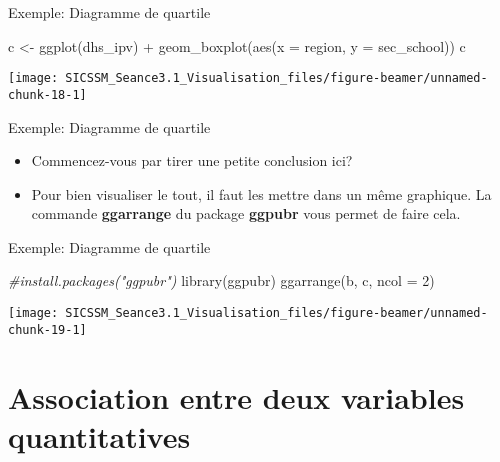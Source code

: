 \documentclass[
  ignorenonframetext,
]{beamer}
\newenvironment{Shaded}{\begin{snugshade}}{\end{snugshade}}
\newcommand{\AttributeTok}[1]{\textcolor[rgb]{0.77,0.63,0.00}{#1}}
\newcommand{\CommentTok}[1]{\textcolor[rgb]{0.56,0.35,0.01}{\textit{#1}}}
\newcommand{\DecValTok}[1]{\textcolor[rgb]{0.00,0.00,0.81}{#1}}
\newcommand{\FunctionTok}[1]{\textcolor[rgb]{0.00,0.00,0.00}{#1}}
\newcommand{\NormalTok}[1]{#1}
\newcommand{\OtherTok}[1]{\textcolor[rgb]{0.56,0.35,0.01}{#1}}
\newcommand{\SpecialCharTok}[1]{\textcolor[rgb]{0.00,0.00,0.00}{#1}}
\providecommand{\tightlist}{%
  \setlength{\itemsep}{0pt}\setlength{\parskip}{0pt}}
\begin{document}
\begin{frame}[fragile]{Exemple: Diagramme de quartile}
\protect\hypertarget{exemple-diagramme-de-quartile-2}{}
\begin{Shaded}
\begin{Highlighting}[]
\NormalTok{c }\OtherTok{\textless{}{-}} \FunctionTok{ggplot}\NormalTok{(dhs\_ipv) }\SpecialCharTok{+} 
  \FunctionTok{geom\_boxplot}\NormalTok{(}\FunctionTok{aes}\NormalTok{(}\AttributeTok{x =}\NormalTok{ region, }\AttributeTok{y =}\NormalTok{ sec\_school))}
\NormalTok{c}
\end{Highlighting}
\end{Shaded}

\begin{center}\texttt{[image: SICSSM\_Seance3.1\_Visualisation\_files/figure-beamer/unnamed-chunk-18-1]} \end{center}
\end{frame}

\begin{frame}{Exemple: Diagramme de quartile}
\protect\hypertarget{exemple-diagramme-de-quartile-3}{}
\begin{itemize}
\tightlist
\item
  Commencez-vous par tirer une petite conclusion ici?
\item
  Pour bien visualiser le tout, il faut les mettre dans un même
  graphique. La commande \textbf{ggarrange} du package \textbf{ggpubr}
  vous permet de faire cela.
\end{itemize}
\end{frame}

\begin{frame}[fragile]{Exemple: Diagramme de quartile}
\protect\hypertarget{exemple-diagramme-de-quartile-4}{}
\begin{Shaded}
\begin{Highlighting}[]
\CommentTok{\#install.packages("ggpubr")}
\FunctionTok{library}\NormalTok{(ggpubr)}
\FunctionTok{ggarrange}\NormalTok{(b, c, }\AttributeTok{ncol =} \DecValTok{2}\NormalTok{)}
\end{Highlighting}
\end{Shaded}

\begin{center}\texttt{[image: SICSSM\_Seance3.1\_Visualisation\_files/figure-beamer/unnamed-chunk-19-1]} \end{center}
\end{frame}

\hypertarget{association-entre-deux-variables-quantitatives}{%
\section{Association entre deux variables
quantitatives}\label{association-entre-deux-variables-quantitatives}}
\end{document}

